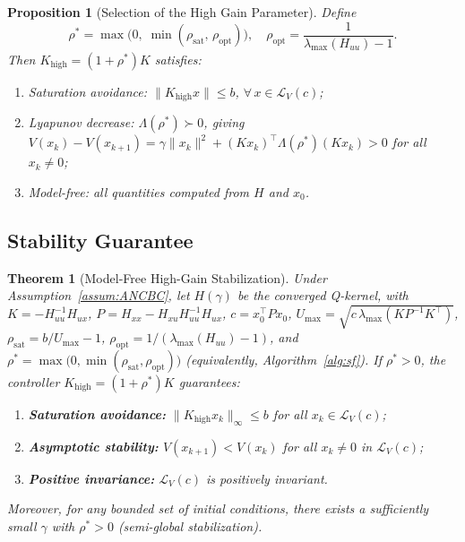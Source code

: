 \documentclass[final,5p,times,authoryear]{elsarticle}
\theoremstyle{plain}
\newtheorem{theorem}{Theorem}
\newtheorem{proposition}{Proposition}
\theoremstyle{definition}
\theoremstyle{remark}
\begin{document}
\begin{proposition}[Selection of the High Gain Parameter]\label{prop:rho_star}
Define
\begin{equation}
\rho^* = \max\!\big(0,\; \min(\rho_{\mathrm{sat}},\,
        \rho_{\mathrm{opt}})\big),
\quad \rho_{\mathrm{opt}} = \frac{1}{\lambda_{\max}(H_{uu})-1}.
\label{eq:rho_star}
\end{equation}
Then $K_{\mathrm{high}} = (1+\rho^*)K$ satisfies:
\begin{enumerate}
\item[(a)] Saturation avoidance:
   $\|K_{\mathrm{high}} x\| \leq b$, $\forall\, x \in \mathcal{L}_V(c)$;
\item[(b)] Lyapunov decrease: $\Lambda(\rho^*) \succ 0$, giving
   $V(x_k) - V(x_{k+1})
     = \gamma\|x_k\|^2
     + (Kx_k)^\top \Lambda(\rho^*)(Kx_k) > 0$
   for all $x_k \neq 0$;
\item[(c)] Model-free: all quantities computed from $H$ and $x_0$.
\end{enumerate}
\end{proposition}

\subsection{Stability Guarantee}\label{sec:stability}

\begin{theorem}[Model-Free High-Gain Stabilization]\label{thm:main}
Under Assumption~\ref{assum:ANCBC}, let $H(\gamma)$ be the converged
Q-kernel, with $K = -H_{uu}^{-1} H_{ux}$,
$P = H_{xx} - H_{xu} H_{uu}^{-1} H_{ux}$, $c = x_0^\top P x_0$,
$U_{\max} = \sqrt{c\,\lambda_{\max}(KP^{-1}K^\top)}$,
$\rho_{\mathrm{sat}} = b/U_{\max} - 1$,
$\rho_{\mathrm{opt}} = 1/(\lambda_{\max}(H_{uu}) - 1)$, and
$\rho^{*} = \max\!\big(0, \min(\rho_{\mathrm{sat}},
\rho_{\mathrm{opt}})\big)$ (equivalently, Algorithm~\ref{alg:sf}).  If
$\rho^{*} > 0$, the controller $K_{\mathrm{high}} = (1+\rho^{*})K$
guarantees:
\begin{enumerate}
\item[(a)] \textbf{Saturation avoidance:}
   $\|K_{\mathrm{high}} x_k\|_\infty \leq b$ for all
   $x_k \in \mathcal{L}_V(c)$;
\item[(b)] \textbf{Asymptotic stability:}
   $V(x_{k+1}) < V(x_k)$ for all $x_k \neq 0$ in $\mathcal{L}_V(c)$;
\item[(c)] \textbf{Positive invariance:} $\mathcal{L}_V(c)$ is
   positively invariant.
\end{enumerate}
Moreover, for any bounded set of initial conditions, there exists a
sufficiently small $\gamma$ with $\rho^{*} > 0$ (semi-global
stabilization).
\end{theorem}
\end{document}
